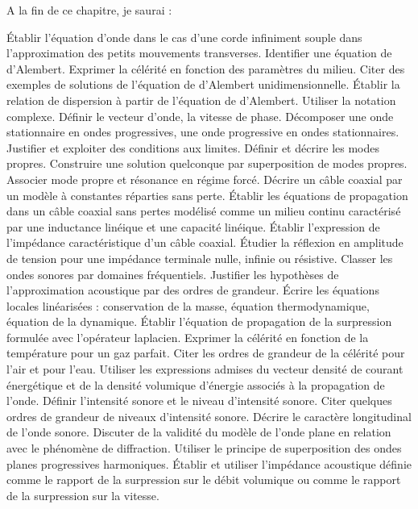 A la fin de ce chapitre, je saurai :
\begin{competences}
    \point Établir l’équation d’onde dans le cas d’une corde infiniment souple dans l’approximation des petits mouvements transverses.
    \point Identifier une équation de d’Alembert.
    \point Exprimer la célérité en fonction des paramètres du milieu.
    \point Citer des exemples de solutions de l’équation de d’Alembert unidimensionnelle.
    \point Établir la relation de dispersion à partir de l’équation de d’Alembert.
    \point Utiliser la notation complexe.
    \point Définir le vecteur d’onde, la vitesse de phase.
    \point Décomposer une onde stationnaire en ondes progressives, une onde progressive en ondes stationnaires.
    \point Justifier et exploiter des conditions aux limites.
    \point Définir et décrire les modes propres.
    \point Construire une solution quelconque par superposition de modes propres.
    \point Associer mode propre et résonance en régime forcé.
    \point Décrire un câble coaxial par un modèle à constantes réparties sans perte.
    \point Établir les équations de propagation dans un câble coaxial sans pertes modélisé comme un milieu continu caractérisé par une inductance linéique et une capacité linéique.
    \point Établir l’expression de l’impédance caractéristique d’un câble coaxial.
    \point \faSignLanguage Étudier la réflexion en amplitude de tension pour une impédance terminale nulle, infinie ou résistive.
    \point Classer les ondes sonores par domaines fréquentiels.
    \point Justifier les hypothèses de l’approximation acoustique par des ordres de grandeur.
    \point Écrire les équations locales linéarisées : conservation de la masse, équation thermodynamique, équation de la dynamique.
    \point Établir l’équation de propagation de la surpression formulée avec l’opérateur laplacien.
    \point Exprimer la célérité en fonction de la température pour un gaz parfait.
    \point Citer les ordres de grandeur de la célérité pour l’air et pour l’eau.
    \point Utiliser les expressions admises du vecteur densité de courant énergétique et de la densité volumique d’énergie associés à la propagation de l’onde.
    \point Définir l’intensité sonore et le niveau d’intensité sonore.
    \point Citer quelques ordres de grandeur de niveaux d’intensité sonore.
    \point Décrire le caractère longitudinal de l'onde sonore.
    \point Discuter de la validité du modèle de l’onde plane en relation avec le phénomène de diffraction.
    \point Utiliser le principe de superposition des ondes planes progressives harmoniques.
    \point Établir et utiliser l’impédance acoustique définie comme le rapport de la surpression sur le débit volumique ou comme le rapport de la surpression sur la vitesse.

\end{competences}
